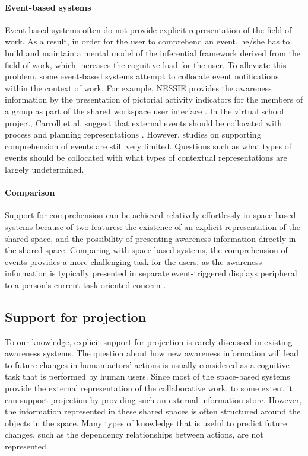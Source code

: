 \paragraph*{Event-based systems} %
\label{par:event_based_sytems}
Event-based systems often do not provide explicit representation of the field of work. As a result, in order for the user to comprehend an event, he/she has to build and maintain a mental model of the inferential framework derived from the field of work, which increases the cognitive load for the user. To alleviate this problem, some event-based systems attempt to collocate event notifications within the context of work. For example, NESSIE provides the awareness information by the presentation of pictorial activity indicators for the members of a group as part of the shared workspace user interface \cite{prinz1999a}. In the virtual school project, Carroll et al. suggest that external events should be collocated with process and planning representations \cite{carroll2003a}. However, studies on supporting comprehension of events are still very limited. Questions such as what types of events should be collocated with what types of contextual representations are largely undetermined.

\paragraph*{Comparison} %
\label{par:comparison}
Support for comprehension can be achieved relatively effortlessly in space-based systems because of two features: the existence of an explicit representation of the shared space, and the possibility of presenting awareness information directly in the shared space. Comparing with space-based systems, the comprehension of events provides a more challenging task for the users, as the awareness information is typically presented in separate event-triggered displays peripheral to a person's current task-oriented concern \cite{carroll2003a}. 

\subsection{Support for projection} %
\label{sub:support_for_projection}
To our knowledge, explicit support for projection is rarely discussed in existing awareness systems. The question about how new awareness information will lead to future changes in human actors' actions is usually considered as a cognitive task that is performed by human users. Since most of the space-based systems provide the external representation of the collaborative work, to some extent it can support projection by providing such an external information store. However, the information represented in these shared spaces is often structured around the objects in the space. Many types of knowledge that is useful to predict future changes, such as the dependency relationships between actions, are not represented.


